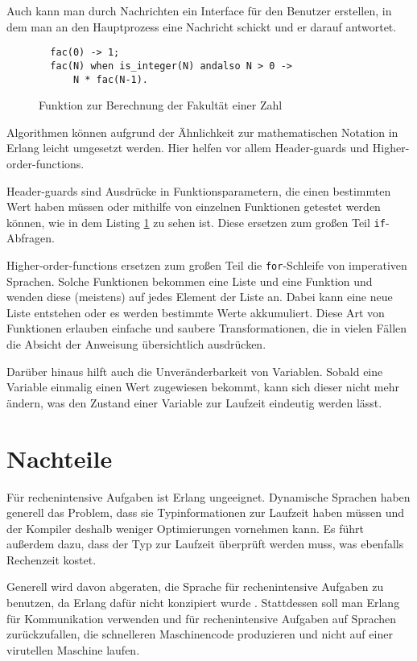 Auch kann man durch Nachrichten ein Interface für den Benutzer
erstellen, in dem man an den Hauptprozess eine Nachricht schickt und
er darauf antwortet.

\medskip
\renewcommand{\figurename}{Listing}
\begin{figure}[ht]
  \centering
  \begin{lstlisting}
  fac(0) -> 1;
  fac(N) when is_integer(N) andalso N > 0 ->
      N * fac(N-1).
    \end{lstlisting}
    \caption{\label{lst:fac} Funktion zur Berechnung der Fakultät einer Zahl}
\end{figure}
\renewcommand{\figurename}{Abbildung}


Algorithmen können aufgrund der Ähnlichkeit zur mathematischen Notation
in Erlang leicht umgesetzt werden. Hier helfen vor allem Header-guards und
Higher-order-functions.

Header-guards sind Ausdrücke in Funktionsparametern, die einen
bestimmten Wert haben müssen oder mithilfe von einzelnen Funktionen
getestet werden können, wie in dem Listing \ref{lst:fac} zu sehen ist.
Diese ersetzen zum großen Teil \lstinline!if!-Abfragen.

Higher-order-functions ersetzen zum großen Teil die
\lstinline!for!-Schleife von imperativen Sprachen.  Solche Funktionen
bekommen eine Liste und eine Funktion und wenden diese (meistens) auf
jedes Element der Liste an.  Dabei kann eine neue Liste entstehen oder
es werden bestimmte Werte akkumuliert.  Diese Art von Funktionen
erlauben einfache und saubere Transformationen, die in vielen Fällen
die Absicht der Anweisung übersichtlich ausdrücken.

Darüber hinaus hilft auch die Unveränderbarkeit von Variablen. Sobald
eine Variable einmalig einen Wert zugewiesen bekommt, kann sich dieser
nicht mehr ändern, was den Zustand einer
Variable zur Laufzeit eindeutig werden lässt.

\section{Nachteile}
\label{sec:disadv}
Für rechenintensive Aufgaben ist Erlang ungeeignet.  Dynamische
Sprachen haben generell das Problem, dass sie Typinformationen zur
Laufzeit haben müssen und der Kompiler deshalb weniger Optimierungen
vornehmen kann.  Es führt außerdem dazu, dass der Typ zur Laufzeit
überprüft werden muss, was ebenfalls Rechenzeit kostet.

Generell wird davon abgeraten, die Sprache für rechenintensive Aufgaben zu
benutzen, da Erlang dafür nicht konzipiert wurde
\cite[Kapitel~3]{lyse}.  Stattdessen soll man Erlang für Kommunikation
verwenden und für rechenintensive Aufgaben auf Sprachen
zurückzufallen, die schnelleren Maschinencode produzieren und nicht
auf einer virutellen Maschine laufen.

